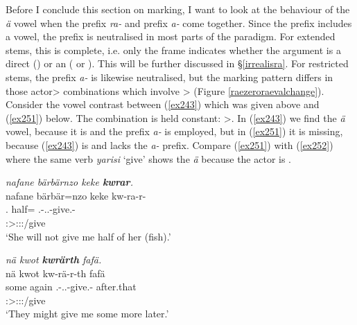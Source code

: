Before I conclude this section on  marking, I want to look at the behaviour of the \emph{ä} vowel when the  prefix \emph{ra-} and  prefix \emph{a-} come together. Since the  prefix includes a vowel, the  prefix is neutralised in most parts of the paradigm. For extended stems, this  is complete, i.e. only the  frame indicates whether the  argument is a direct  (\Abs{}) or an  (\Dat{} or \Poss{}). This will be further discussed in \S{}\ref{irrealisra}. For restricted stems, the  prefix \emph{a-} is likewise neutralised, but the  marking pattern differs in those actor> combinations which involve \Sg>\Sg{} (Figure \ref{raezeroraevalchange}). Consider the vowel contrast between (\ref{ex243}) which was given above and (\ref{ex251}) below. The  combination is held constant: \Tsg>\Fsg{}. In (\ref{ex243}) we find the \emph{ä} vowel, because it is  and the  prefix \emph{a-} is employed, but in (\ref{ex251}) it is missing, because (\ref{ex243}) is  and lacks the \emph{a-} prefix. Compare (\ref{ex251}) with (\ref{ex252}) where the same verb \emph{yarisi} `give' shows the \emph{ä} because the actor  is .

\begin{exe}
	\ex \emph{nafane bärbärnzo keke \textbf{kwrar}.}\\
	\glll nafane {bärbär=nzo} keke kw-ra-r-\Zero\\
	\Tsg.\Poss{} {half=\Only} \Neg{} \Fsg.\Bet{}-\Irr.\Ndu.\Vc-give.\Rs-\Stsg\\
	{} {} {} \footnotesize{\Stsg:\Sbj>\Fsg:\Io:\Irr:\Pfv/give}\\
	\trans `She will not give me half of her (fish).' 
	\label{ex251}
\end{exe}
\begin{exe}
	\ex \emph{nä kwot \textbf{kwrärth} fafä.}\\
	\glll nä kwot kw-rä-r-th fafä\\
	some again \Fsg.\Bet-\Irr.\Pl.\Vc-give.\Rs-\Stnsg{} after.that\\
	{} {} \footnotesize{\Stpl:\Sbj>\Fsg:\Io:\Irr:\Pfv/give} {}\\
	\trans `They might give me some more later.' 
	\label{ex252}
\end{exe}


